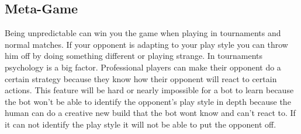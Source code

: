\subsection{Meta-Game}		
		Being unpredictable can win you the game when playing in tournaments and normal matches. 
		If your opponent is adapting to your play style you can throw him off by doing something different or playing strange.
		In tournaments psychology is a big factor. Professional players can make their opponent do a certain strategy because they know 
		how their opponent will react to certain actions. This feature will be hard or nearly impossible for a bot to learn because the bot won't be able to 
		identify the opponent's play style in depth because the human can do a creative new build that the bot wont know and can't react to. 
		If it can not identify the play style it will not be able to put the opponent off.

